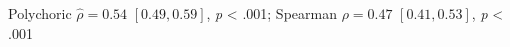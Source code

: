 Polychoric $\hat{\rho}=0.54$ \([0.49, 0.59]\), \textit{p} < .001; Spearman $\rho=0.47$ \([0.41, 0.53]\), \textit{p} < .001%
